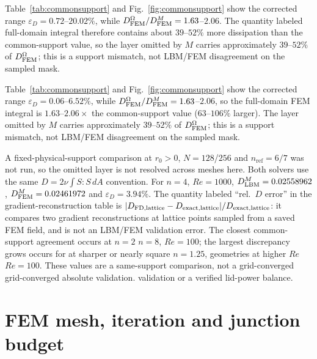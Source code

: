 \documentclass[11pt]{article}
\begin{document}
\color{revred}Table~\ref{tab:commonsupport} and Fig.~\ref{fig:commonsupport} show the corrected range $\varepsilon_D=0.72$--$20.02\%$, while $D_{\rm FEM}^{\Omega}/D_{\rm FEM}^{M}=1.63$--$2.06$. The quantity labeled full-domain integral therefore contains about $39$--$52\%$ more dissipation than the common-support value, so the layer omitted by $M$ carries approximately $39$--$52\%$ of $D_{\rm FEM}^{\Omega}$; this is a support mismatch, not LBM/FEM disagreement on the sampled mask.\par
\color{revblue}Table~\ref{tab:commonsupport} and Fig.~\ref{fig:commonsupport} show the corrected range $\varepsilon_D=0.06$--$6.52\%$, while $D_{\rm FEM}^{\Omega}/D_{\rm FEM}^{M}=1.63$--$2.06$, so the full-domain FEM integral is $1.63$--$2.06\times$ the common-support value ($63$--$106\%$ larger). The layer omitted by $M$ carries approximately $39$--$52\%$ of $D_{\rm FEM}^{\Omega}$; this is a support mismatch, not LBM/FEM disagreement on the sampled mask.\par
\color{black}
A fixed-physical-support comparison
\color{black}
\color{revblue}at $r_0>0$, $N=128$/$256$ and $n_{\mathrm{ref}}=6/7$ was not run, so the omitted
\color{black}
\color{revblue}layer is not resolved across meshes here. Both solvers use the same
\color{black}
\color{revblue}$D=2\nu\int S:S\,dA$ convention. For $n=4$, $Re=1000$,
\color{black}
\color{revblue}$D_{\rm LBM}^{M}=0.02558962$, $D_{\rm FEM}^{M}=0.02461972$ and
\color{black}
\color{revblue}$\varepsilon_D=3.94\%$. The quantity labeled
\color{black}
``rel.\ $D$ error'' in the gradient-reconstruction table is
$|D_{\rm FD,lattice}-D_{\rm exact,lattice}|/D_{\rm exact,lattice}$: it compares
two gradient reconstructions at lattice points sampled from a saved FEM field,
and is not an LBM/FEM validation error. The closest common-support agreement
occurs at \color{revred}$n=2$ \color{revblue}$n=8$\color{black}, $Re=100$; the \color{revblue}largest \color{black}discrepancy \color{revred}grows \color{revblue}occurs\color{black} \color{revred}for \color{revblue}at\color{black} \color{revred}sharper or nearly square \color{revblue}$n=1.25$,\color{black}
\color{revred}geometries at higher $Re$ \color{revblue}$Re=100$\color{black}. These values are a same-support comparison, not a\color{revblue} grid-converged\color{black}
\color{revred}grid-converged \color{black}absolute \color{revred}validation. \color{revblue}validation or a verified lid-power balance.\color{black}

\section{FEM mesh, iteration and junction budget}
\label{sec:fem_budget}
\end{document}
